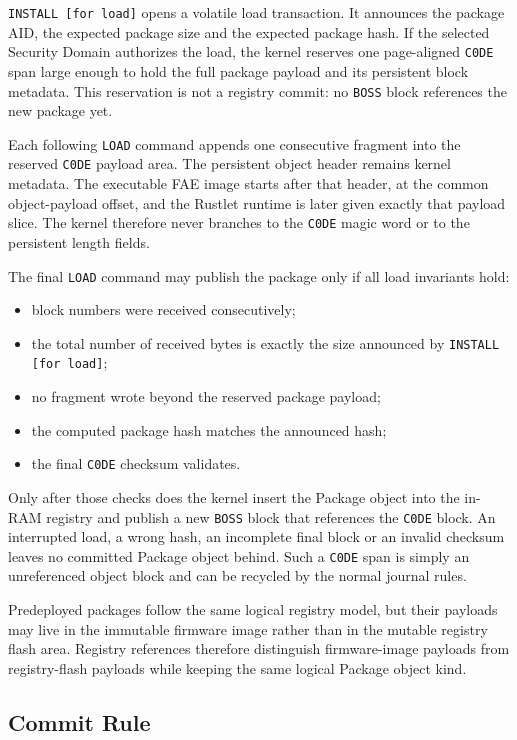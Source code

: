 \texttt{INSTALL [for load]} opens a volatile load transaction. It announces
the package AID, the expected package size and the expected package hash. If
the selected Security Domain authorizes the load, the kernel reserves one
page-aligned \texttt{C0DE} span large enough to hold the full package payload
and its persistent block metadata. This reservation is not a registry commit:
no \texttt{BOSS} block references the new package yet.

Each following \texttt{LOAD} command appends one consecutive fragment into the
reserved \texttt{C0DE} payload area. The persistent object header remains
kernel metadata. The executable FAE image starts after that header, at the
common object-payload offset, and the Rustlet runtime is later given exactly
that payload slice. The kernel therefore never branches to the \texttt{C0DE}
magic word or to the persistent length fields.

The final \texttt{LOAD} command may publish the package only if all load
invariants hold:

\begin{itemize}
\item block numbers were received consecutively;
\item the total number of received bytes is exactly the size announced by
  \texttt{INSTALL [for load]};
\item no fragment wrote beyond the reserved package payload;
\item the computed package hash matches the announced hash;
\item the final \texttt{C0DE} checksum validates.
\end{itemize}

Only after those checks does the kernel insert the Package object into the
in-RAM registry and publish a new \texttt{BOSS} block that references the
\texttt{C0DE} block. An interrupted load, a wrong hash, an incomplete final
block or an invalid checksum leaves no committed Package object behind. Such a
\texttt{C0DE} span is simply an unreferenced object block and can be recycled
by the normal journal rules.

Predeployed packages follow the same logical registry model, but their
payloads may live in the immutable firmware image rather than in the mutable
registry flash area. Registry references therefore distinguish firmware-image
payloads from registry-flash payloads while keeping the same logical Package
object kind.

\subsection{Commit Rule}
\label{subsec:persistence-commit-rule}

